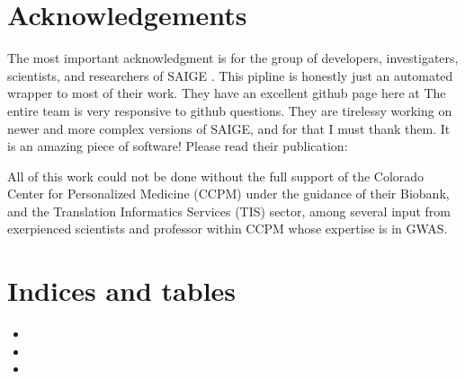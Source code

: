 \documentclass[letterpaper,10pt,english]{sphinxmanual}
\let\sphinxpxdimen\pdfpxdimen\else\newdimen\sphinxpxdimen
\begin{document}
\chapter{Acknowledgements}
\label{\detokenize{index:acknowledgements}}
The most important acknowledgment is for the group of developers, investigaters, scientists, and researchers of SAIGE .  This pipline is honestly just an automated wrapper to most of their work.  They have an excellent github page here at  \sphinxhyphen{}\sphinxhyphen{} The entire team is very responsive to github questions.  They are tirelessy working on newer and more complex versions of SAIGE, and for that I must thank them.  It is an amazing piece of software!  Please read their publication:


All of this work could not be done without the full support of the Colorado Center for Personalized Medicine (CCPM) under the guidance of their Biobank, and the Translation Informatics Services (TIS) sector, among several input from exerpienced scientists and professor within CCPM whose expertise is in GWAS.
\begin{quote}

\noindent{\hspace*{\fill}\sphinxincludegraphics[width=200\sphinxpxdimen]{{tis_logo}.png}\hspace*{\fill}}
\end{quote}


\chapter{Indices and tables}
\label{\detokenize{index:indices-and-tables}}\begin{itemize}
\item {} 

\item {} 

\item {} 

\end{itemize}



\renewcommand{\indexname}{Index}
\printindex
\end{document}
